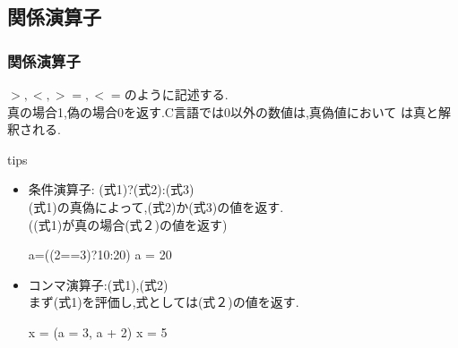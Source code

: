 \documentclass[dvipdfmx]{beamer}
\begin{document}
\subsection{関係演算子}
\begin{frame}[t, fragile, label=21]
    \frametitle{関係演算子}
    $>,<,>=,<=$のように記述する.\\
    真の場合1,偽の場合0を返す.C言語では0以外の数値は,真偽値において
    は真と解釈される.
    \begin{itembox}[l]{tips}
        \begin{itemize}
            \item 条件演算子: (式1)?(式2):(式3)\\
                (式1)の真偽によって,(式2)か(式3)の値を返す.\\
                ((式1)が真の場合(式２)の値を返す)
                \begin{block}{a=((2==3)?10:20)}
                    a = 20
                \end{block}
            \item コンマ演算子:(式1),(式2)\\
                まず(式1)を評価し,式としては(式２)の値を返す.
                \begin{block}{x = (a = 3, a + 2)}
                    x = 5
                \end{block}
        \end{itemize}
    \end{itembox}
    \vfill \hfill 
    \hyperlink{20}{}
    \space
    \hyperlink{22}{}
\end{frame}
\end{document}
